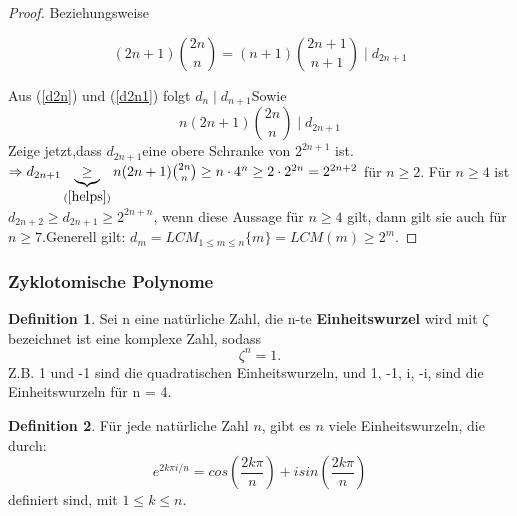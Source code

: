 \documentclass[12pt,oneside]{article}
\theoremstyle{remark}
\theoremstyle{definition}
\newtheorem{definition}{Definition}[section]
\begin{document}
\begin{flushleft}
\begin{proof}
Beziehungsweise 

\begin{equation}\label{d2n1}
    (2n + 1) {2n \choose n} = (n + 1) {2n + 1 \choose n + 1} \mid d_{2n + 1} 
\end{equation}

\smallskip
Aus (\ref{d2n}) und (\ref{d2n1}) folgt $d_{n} \mid d_{n+1}$\newline\newline Sowie 
\begin{equation}\label{helps}
    n(2n + 1) {2n \choose n} \mid d_{2n + 1}
\end{equation}
\newline\newline
Zeige jetzt,dass $d_{2n+1} $eine obere Schranke von $2^{2n + 1}$ ist.\newline\newline  
$\Rightarrow d_{2n + 1} \underbrace{\geq}_{(\ref{helps})} n (2n + 1) {2n \choose n} \geq n \cdot 4^n \geq 2 \cdot 2^{2n} = 2^{2n + 2}$ für $n \geq 2$.\newline\newline
Für $n \geq 4$ ist $d_{2n + 2} \geq d_{2n + 1} \geq 2^{2n + n }$, wenn diese Aussage für $n \geq 4 $ gilt, dann gilt sie auch für $n \geq 7$.\newline\newline Generell gilt: $d_{m} = LCM_{1 \leq m \leq n} \{m\} = LCM(m) \geq  2^m $.
\end{proof}

\smallskip


\end{flushleft}


\subsubsection{Zyklotomische Polynome}

\begin{definition}
Sei n eine natürliche Zahl, die n-te \textbf{Einheitswurzel} wird mit $\zeta$ bezeichnet ist eine komplexe Zahl, sodass
\begin{equation}
    \zeta^n = 1.
\end{equation}
Z.B. 1 und -1 sind die quadratischen Einheitswurzeln, und 1, -1, i, -i, sind die Einheitswurzeln für n = 4.    
\end{definition}

\smallskip

\begin{definition}
Für jede natürliche Zahl $n$, gibt es $n$ viele Einheitswurzeln, die durch:\newline
\begin{equation}
    e^{2k\pi i/n} = cos(\frac{2k \pi }{n}) + i sin(\frac{2k \pi}{n})
\end{equation}
definiert sind, mit $1 \leq k \leq n$.
\end{definition}
\end{document}

